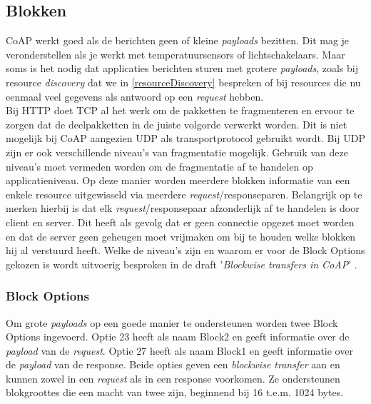 \subsection{Blokken} \label{blocks}
CoAP werkt goed als de berichten geen of kleine \textit{payloads} bezitten. Dit mag je veronderstellen als je werkt met temperatuursensors of lichtschakelaars. Maar soms is het nodig dat applicaties berichten sturen met grotere \textit{payloads}, zoals bij resource \textit{discovery} dat we in \ref{resourceDiscovery} bespreken of bij resources die nu eenmaal veel gegevens als antwoord op een \textit{request} hebben.\\

Bij HTTP doet TCP al het werk om de pakketten te fragmenteren en ervoor te zorgen dat de deelpakketten in de juiste volgorde verwerkt worden. Dit is niet mogelijk bij CoAP aangezien UDP als transportprotocol gebruikt wordt. Bij UDP zijn er ook verschillende niveau's van fragmentatie mogelijk. Gebruik van deze niveau's moet vermeden worden om de fragmentatie af te handelen op applicatieniveau. Op deze manier worden meerdere blokken informatie van een enkele resource uitgewisseld via meerdere \textit{request}/responseparen. Belangrijk op te merken hierbij is dat elk \textit{request}/responsepaar afzonderlijk af te handelen is door client en server. Dit heeft als gevolg dat er geen connectie opgezet moet worden en dat de server geen geheugen moet vrijmaken om bij te houden welke blokken hij al verstuurd heeft. Welke de niveau's zijn en waarom er voor de Block Options gekozen is wordt uitvoerig besproken in de draft '\textit{Blockwise transfers in CoAP}' \cite{blockwiseTransfer}.

\subsubsection{Block Options}
Om grote \textit{payloads} op een goede manier te ondersteunen worden twee Block Options ingevoerd. Optie 23 heeft als naam Block2 en geeft informatie over de \textit{payload} van de \textit{request}. Optie 27 heeft als naam Block1 en geeft informatie over de \textit{payload} van de response. Beide opties  geven een \textit{blockwise transfer} aan en kunnen zowel in een \textit{request} als in een response voorkomen. Ze ondersteunen blokgroottes die een macht van twee zijn, beginnend bij 16 t.e.m. 1024 bytes.

